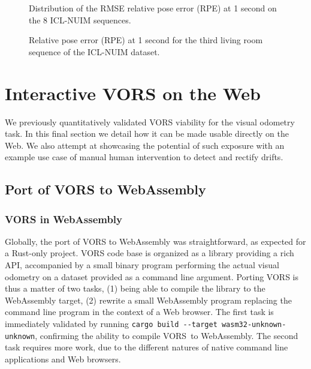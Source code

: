 \begin{figure}[ht]
	\centering
	
	\caption{Distribution of the RMSE relative pose error (RPE) at 1 second
	on the 8 ICL-NUIM sequences.}%
	\label{fig:rpe_rmse_icl}
\end{figure}

\begin{figure}[ht]
	\centering
	
	\caption{Relative pose error (RPE) at 1 second for the third
	living room sequence of the ICL-NUIM dataset.}%
	\label{fig:rpe_icl3}
\end{figure}

\clearpage
\section{Interactive VORS on the Web}%
\label{sec:interactive-vors}

We previously quantitatively validated VORS viability for the visual odometry task.
In this final section we detail how it can be made usable directly on the Web.
We also attempt at showcasing the potential of such exposure with
an example use case of manual human intervention to detect and rectify drifts.

\subsection{Port of VORS to WebAssembly}%
\label{sub:vors-port-wasm}

\subsubsection{VORS in WebAssembly}%

Globally, the port of VORS to WebAssembly was straightforward,
as expected for a Rust-only project.
VORS code base is organized as a library providing a rich API,
accompanied by a small binary program performing the actual visual odometry
on a dataset provided as a command line argument.
Porting VORS is thus a matter of two tasks,
(1) being able to compile the library to the WebAssembly target,
(2) rewrite a small WebAssembly program replacing the command line program
in the context of a Web browser.
The first task is immediately validated by running
\verb|cargo build --target wasm32-unknown-unknown|,
confirming the ability to compile VORS to WebAssembly.
The second task requires more work,
due to the different natures of native command line applications and Web browsers.

